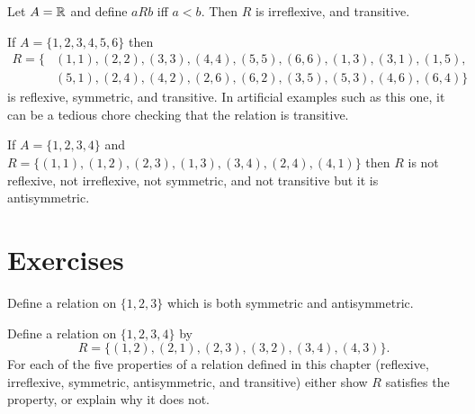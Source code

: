 \begin{exmp} Let $A=\mathbb{R}$ and define $aRb$ iff $a<b$. Then $R$ is irreflexive,
 and transitive.
\end{exmp}
 
\begin{exmp} If $A=\{1,2,3,4,5,6\}$ then 
\begin{align*}
 R=\{&(1,1),(2,2),(3,3),(4,4),(5,5),(6,6),(1,3),(3,1),(1,5), \\
     &(5,1),(2,4),(4,2),(2,6),(6,2),(3,5),(5,3),(4,6),(6,4)\}
\end{align*}
 is reflexive, symmetric, and transitive. In artificial examples such as this one,
 it can be a tedious chore checking that the relation is transitive.
\end{exmp}
 
\begin{exmp} If $A=\{1,2,3,4\}$ and $R=\{(1,1),(1,2),(2,3),(1,3),(3,4),(2,4),(4,1)\}$
  then $R$ is not 
 reflexive, not irreflexive, not symmetric, and not transitive  but it is antisymmetric.
\end{exmp}

\clearpage




\section{Exercises}

\begin{exer}
 Define a relation on $\{1,2,3\}$ which is both symmetric and antisymmetric.
\end{exer}

\begin{exer} 
Define a relation on $\{1,2,3,4\}$ by
 \[
  R=\{(1,2),(2,1),(2,3),(3,2),(3,4),(4,3)\}.
 \]
For each of the five properties of a relation defined in this chapter (reflexive, irreflexive, symmetric, antisymmetric, and transitive) 
either show $R$ satisfies the property, or explain why it does not.
\end{exer}

